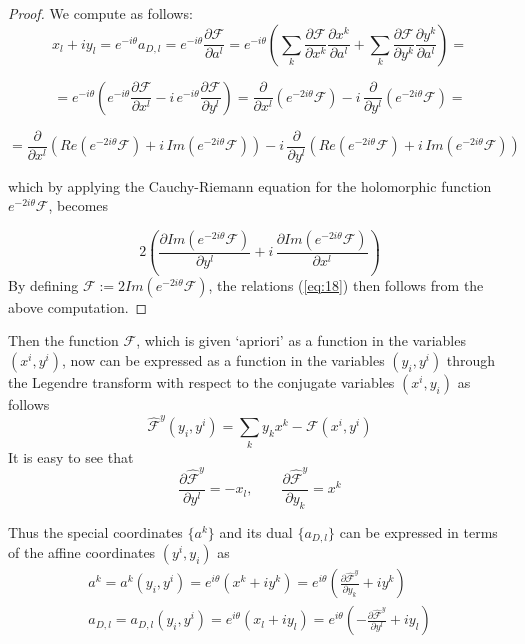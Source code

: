 \documentclass{article}
\begin{document}
\begin{proof} We compute as follows:
\[x_{l}+iy_{l}=e^{-i\theta}a_{D,l}=e^{-i\theta}\frac{\partial\mathcal{F}}{\partial a^{l}}=e^{-i\theta}\left(\sum_{k}\frac{\partial\mathcal{F}}{\partial x^{k}}\frac{\partial x^{k}}{\partial a^{l}}+\sum_{k}\frac{\partial\mathcal{F}}{\partial y^{k}}\frac{\partial y^{k}}{\partial a^{l}}\right)=
\]

\[=e^{-i\theta}\left(e^{-i\theta}\frac{\partial\mathcal{F}}{\partial x^{l}}-i\,e^{-i\theta}\frac{\partial\mathcal{F}}{\partial y^{l}}\right)=\frac{\partial}{\partial x^{l}}\left(e^{-2i\theta}\mathcal{F}\right)-i\,\frac{\partial}{\partial y^{l}}\left(e^{-2i\theta}\mathcal{F}\right)=\]

\[=\frac{\partial}{\partial x^{l}}\left(Re\left(e^{-2i\theta}\mathcal{F}\right)+i\,Im\left(e^{-2i\theta}\mathcal{F}\right)\right)-i\,\frac{\partial}{\partial y^{l}}\left(Re\left(e^{-2i\theta}\mathcal{F}\right)+i\,Im\left(e^{-2i\theta}\mathcal{F}\right)\right)\]

which by applying the Cauchy-Riemann equation for the holomorphic function $e^{-2i\theta}\mathcal{F}$, becomes

\[2\left(\frac{\partial Im\left(e^{-2i\theta}\mathcal{F}\right)}{\partial y^{l}}+i\,\frac{\partial Im\left(e^{-2i\theta}\mathcal{F}\right)}{\partial x^{l}}\right)
\]
By defining $\mathscr{F}:=2Im\left(e^{-2i\theta}\mathcal{F}\right)$, the relations (\ref{eq:18}) then follows from the above computation.
\end{proof}

Then the function $\mathscr{F}$, which is given `apriori' as a function in the variables $(x^{i}, y^{i})$, now can be expressed as a function in the variables $(y_{i},y^{i})$ through the Legendre transform with respect to the conjugate variables $(x^{i},y_{i})$ as follows
\begin{equation}
    \widehat{\mathscr{F}}^{y}(y_{i},y^{i})=\sum_{k}y_{k}x^{k}-\mathscr{F}(x^{i},y^{i})
\end{equation}
It is easy to see that
\begin{equation}\label{eq:20}
    \frac{\partial\widehat{\mathscr{F}}^{y}}{\partial y^{l}}=-x_{l},\qquad \frac{\partial\widehat{\mathscr{F}}^{y}}{\partial y_{k}}=x^{k}
\end{equation}

Thus the special coordinates $\{a^{k}\}$ and its dual $\{a_{D,l}\}$ can be expressed in terms of the affine coordinates $(y^{i},y_{i})$ as
\begin{align}
    a^{k}=a^{k}(y_{i},y^{i})=e^{i\theta}(x^{k}+iy^{k})=e^{i\theta}\left(\frac{\partial\mathscr{\widehat{F}}^{y}}{\partial y_{k}}+iy^{k
    }\right)\\
    a_{D,l}=a_{D,l}(y_{i},y^{i})=e^{i\theta}(x_{l}+iy_{l})=e^{i\theta}\left(-\frac{\partial\widehat{\mathscr{F}}^{y}}{\partial y^{l}}+iy_{l}\right)
\end{align}
\end{document}

